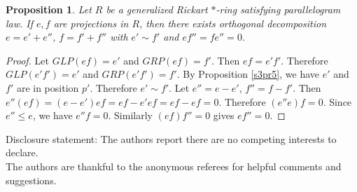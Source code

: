 \documentclass[11pt, one side,emlines]{amsart}
\newtheorem{proposition}[lemma]{Proposition}
\theoremstyle{definition}
\numberwithin{equation}{section} \thispagestyle{empty} \voffset
\begin{document}
     \begin{proposition} Let $R$ be a generalized Rickart $*$-ring satisfying parallelogram law. If $e,f$  are projections in $R$, then there exists orthogonal decomposition $e=e'+e''$, $f=f'+f''$ with $e' \sim f'$ and $ef''=fe''=0$.
     \end{proposition}	
     \begin{proof} Let $GLP(ef)=e'$ and $GRP(ef)= f'$. Then $ef= e'f'$. 
     Therefore 	$ GLP(e'f')= e'$ and $GRP(e'f')= f'$.
     By Proposition \ref{s3pr5}, we have $e'$ and $f'$ are in position $p'$.
     Therefore  $e' \sim f'$. Let $e''=e-e'$, $f''=f-f'$. Then  $e''(ef) = (e-e')ef = ef-e'ef = ef-ef = 0$.
     Therefore $(e''e)f = 0$. Since $e''\le  e$, we have  $e''f = 0 $. 
     Similarly $(ef)f''=0$ gives $ef'' = 0$.
     \end{proof}
     

    
    Disclosure statement: The authors report there are no competing interests to declare.\\
    
     
              The authors are thankful to the anonymous referees for helpful comments and suggestions. 
                   
\end{document}
